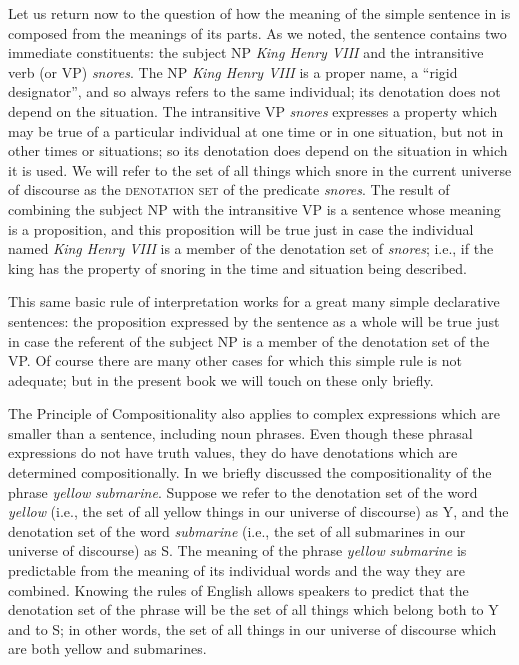 Let us return now to the question of how the meaning of the simple sentence in  is composed from the meanings of its parts. As we noted, the sentence contains two immediate constituents: the subject NP \textit{King Henry VIII} and the intransitive verb (or VP) \textit{snores}. The NP \textit{King Henry VIII} is a proper name, a “rigid designator”, and so always refers to the same individual; its denotation does not depend on the situation. The intransitive VP \textit{snores} expresses a property which may be true of a particular individual at one time or in one situation, but not in other times or situations; so its denotation does depend on the situation in which it is used. We will refer to the set of all things which snore in the current universe of discourse as the \textsc{denotation set} of the predicate \textit{snores}. The result of combining the subject NP with the intransitive VP is a sentence whose meaning is a proposition, and this proposition will be true just in case the individual named \textit{King Henry VIII} is a member of the denotation set of \textit{snores}; i.e., if the king has the property of snoring in the time and situation being described.



This same basic rule of interpretation works for a great many simple declarative sentences: the proposition expressed by the sentence as a whole will be true just in case the referent of the subject NP is a member of the denotation set of the VP. Of course there are many other cases for which this simple rule is not adequate; but in the present book we will touch on these only briefly.



The Principle of Compositionality also applies to complex expressions which are smaller than a sentence, including noun phrases. Even though these phrasal expressions do not have truth values, they do have denotations which are determined compositionally. In  we briefly discussed the compositionality of the phrase \textit{yellow} \textit{submarine}. Suppose we refer to the denotation set of the word \textit{yellow} (i.e., the set of all yellow things in our universe of discourse) as Y, and the denotation set of the word \textit{submarine} (i.e., the set of all submarines in our universe of discourse) as S. The meaning of the phrase \textit{yellow} \textit{submarine} is predictable from the meaning of its individual words and the way they are combined. Knowing the rules of English allows speakers to predict that the denotation set of the phrase will be the set of all things which belong both to Y and to S; in other words, the set of all things in our universe of discourse which are both yellow and submarines.



